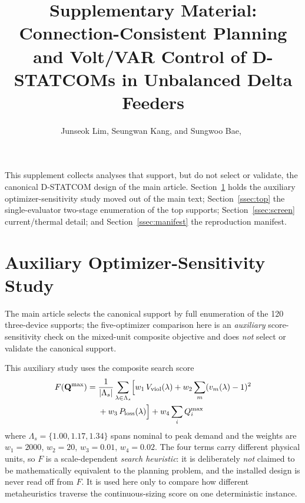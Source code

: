 \documentclass[journal]{IEEEtran}
\newcommand{\Qmax}{Q^{\max}}
\begin{document}
\title{Supplementary Material:\\ Connection-Consistent Planning and Volt/VAR Control
of D-STATCOMs in Unbalanced Delta Feeders}
\author{Junseok Lim, Seungwan Kang, and Sungwoo Bae,~}
\maketitle

This supplement collects analyses that support, but do not select or validate, the
canonical D-STATCOM design of the main article. Section~\ref{ssec:opt} holds the
auxiliary optimizer-sensitivity study moved out of the main text;
Section~\ref{ssec:top} the single-evaluator two-stage enumeration of
the top supports; Section~\ref{ssec:screen} current/thermal detail;
and Section~\ref{ssec:manifest} the reproduction manifest.

\section{Auxiliary Optimizer-Sensitivity Study}
\label{ssec:opt}
The main article selects the canonical support by full enumeration of the 120
three-device supports; the five-optimizer comparison here is an \emph{auxiliary}
score-sensitivity check on the mixed-unit composite objective and does \emph{not}
select or validate the canonical support.

This auxiliary study uses the composite search score
\begin{equation}
\begin{split}
F(\mathbf{Q}^{\max}) ={}&
\frac{1}{|\Lambda_s|}\sum_{\lambda\in\Lambda_s}
\Bigl[w_1\,V_{\mathrm{viol}}(\lambda) + w_2\sum_{m}(v_m(\lambda)-1)^2 \\
&{}+ w_3\, P_{\mathrm{loss}}(\lambda)\Bigr]
+ w_4\sum_{i}\Qmax_i
\end{split}
\label{eq:objective_supp}
\end{equation}
where $\Lambda_s=\{1.00,1.17,1.34\}$ spans nominal to peak demand and the weights are
$w_1=2000$, $w_2=20$, $w_3=0.01$, $w_4=0.02$. The four terms carry different physical
units, so $F$ is a scale-dependent \emph{search heuristic}: it is deliberately
\emph{not} claimed to be mathematically equivalent to the planning problem, and the
installed design is never read off from $F$. It is used here only to compare how
different metaheuristics traverse the continuous-sizing score on one deterministic
instance.
\end{document}
